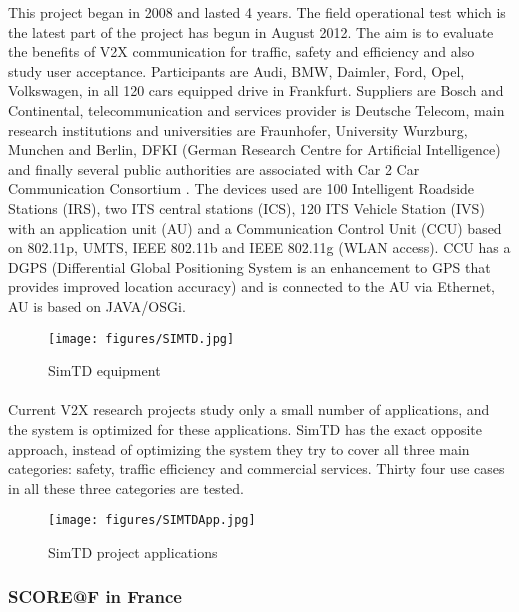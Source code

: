 \documentclass[a4paper]{article}
\begin{document}
This project \cite{SimTD} began in 2008 and lasted 4 years. The field operational test which is the latest part of the project has begun in August 2012. The aim is to evaluate the benefits of V2X communication for traffic, safety and efficiency and also study user acceptance. Participants are Audi, BMW, Daimler, Ford, Opel, Volkswagen, in all 120 cars equipped drive in Frankfurt. Suppliers are Bosch and Continental, telecommunication and services provider is Deutsche Telecom, main research institutions and universities are Fraunhofer, University Wurzburg, Munchen and Berlin, DFKI (German Research Centre for Artificial Intelligence) and finally several public authorities are associated with Car 2 Car Communication Consortium \cite{Strang}. The devices used are 100 Intelligent Roadside Stations (IRS), two ITS central stations (ICS), 120 ITS Vehicle Station (IVS) with an application unit (AU) and a Communication Control Unit (CCU) based on 802.11p, UMTS, IEEE 802.11b and IEEE 802.11g (WLAN access). CCU has a DGPS (Differential Global Positioning System is an enhancement to GPS that provides improved location accuracy) and is connected to the AU via Ethernet, AU is based on JAVA/OSGi.
\begin{figure}[!htb]
\begin{center}
\texttt{[image: figures/SIMTD.jpg]}
\caption{SimTD equipment}
\end{center}
\end{figure}

\paragraph{}Current V2X research projects study only a small number of applications, and the system is optimized for these applications.
SimTD has the exact opposite approach, instead of optimizing the system they try to cover all three main categories: safety, traffic efficiency and commercial services. Thirty four use cases in all these three categories are tested.
\begin{figure}[!htb]
\begin{center}
\texttt{[image: figures/SIMTDApp.jpg]}
\caption{SimTD project applications}
\end{center}
\end{figure}


\subsubsection{SCORE@F in France}
\label{SCORE@F}
\end{document}
